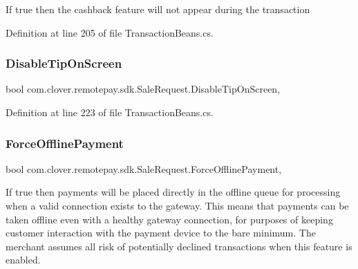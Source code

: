If true then the cashback feature will not appear during the transaction 



Definition at line 205 of file Transaction\+Beans.\+cs.

\mbox{\label{classcom_1_1clover_1_1remotepay_1_1sdk_1_1_sale_request_a1ecc113e6e74c09bcfdb22fde2935693}} 
\subsubsection{\texorpdfstring{Disable\+Tip\+On\+Screen}{DisableTipOnScreen}}
{\footnotesize\ttfamily bool com.\+clover.\+remotepay.\+sdk.\+Sale\+Request.\+Disable\+Tip\+On\+Screen\hspace{0.3cm}{\ttfamily [get]}, {\ttfamily [set]}}



Definition at line 223 of file Transaction\+Beans.\+cs.

\mbox{\label{classcom_1_1clover_1_1remotepay_1_1sdk_1_1_sale_request_a3b9ec1f158eda7a094c83a34a6c2e02a}} 
\subsubsection{\texorpdfstring{Force\+Offline\+Payment}{ForceOfflinePayment}}
{\footnotesize\ttfamily bool com.\+clover.\+remotepay.\+sdk.\+Sale\+Request.\+Force\+Offline\+Payment\hspace{0.3cm}{\ttfamily [get]}, {\ttfamily [set]}}



If true then payments will be placed directly in the offline queue for processing when a valid connection exists to the gateway. This means that payments can be taken offline even with a healthy gateway connection, for purposes of keeping customer interaction with the payment device to the bare minimum. The merchant assumes all risk of potentially declined transactions when this feature is enabled. 



